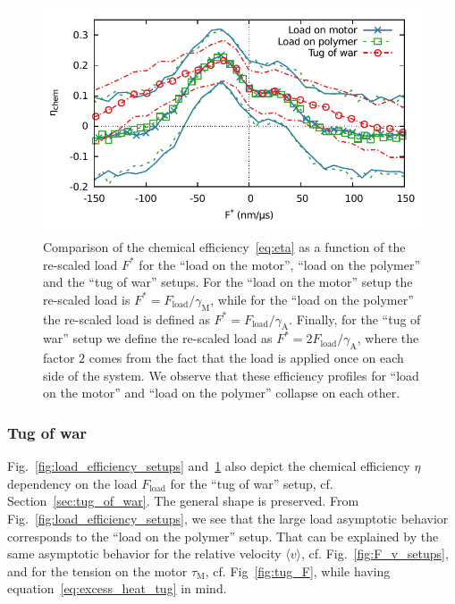 \documentclass[aps,pre,twocolumn,showpacs,showkeys,superscriptaddress,floatfix]{revtex4-1}
\begin{document}
\begin{figure}[t]
\centering
\includegraphics[width=.9\linewidth,height=!]{F_eta_setup_rescaled.pdf}
\caption{\label{fig:load_efficiency_setups_rescaled}
Comparison of the chemical efficiency~\eqref{eq:eta} as a function of the re-scaled load $F^*$ for the ``load on the motor'', ``load on the polymer'' and the ``tug of war'' setups.
For the ``load on the motor'' setup the re-scaled load is $F^* = F_\text{load} / \gamma_\text{M}$, 
while for the ``load on the polymer'' the re-scaled load is defined as $F^* = F_\text{load} / \gamma_\text{A}$.
Finally, for the ``tug of war'' setup we define the re-scaled load as $F^* = 2 F_\text{load} / \gamma_\text{A}$,
where the factor $2$ comes from the fact that the load is applied once on each side of the system.
We observe that these efficiency profiles for ``load on the motor'' and ``load on the polymer'' collapse on each other.    
}
\end{figure}


\subsubsection{Tug of war}
Fig.~\ref{fig:load_efficiency_setups} and~\ref{fig:load_efficiency_setups_rescaled} also depict the chemical efficiency $\eta$ dependency on the load $F_\text{load}$ for the ``tug of war'' setup, cf. Section~\ref{sec:tug_of_war}.
The general shape is preserved.
From Fig.~\ref{fig:load_efficiency_setups}, we see that the large load asymptotic behavior corresponds to the ``load on the polymer'' setup.
That can be explained by the same asymptotic behavior for the relative velocity $\langle v\rangle$, cf. Fig.~\ref{fig:F_v_setups}, 
and for the tension on the motor $\tau_\text{M}$, cf. Fig~\ref{fig:tug_F}, while having equation~\eqref{eq:excess_heat_tug} in mind.
\end{document}
